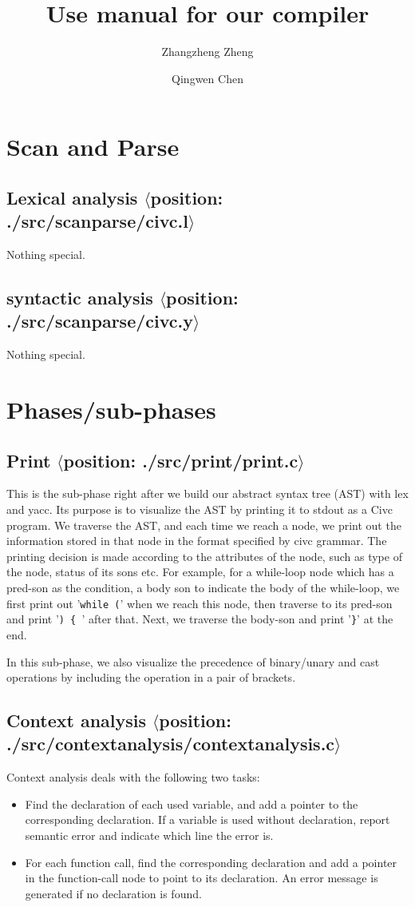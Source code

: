 \documentclass[a4paper,11pt]{article}
\title{Use manual for our compiler}
\author{Zhangzheng Zheng \and Qingwen Chen}
\begin{document}
\maketitle

\section{Scan and Parse}
\subsection{Lexical analysis $\langle$position: ./src/scanparse/civc.l$\rangle$}
Nothing special.
\subsection{syntactic analysis $\langle$position: ./src/scanparse/civc.y$\rangle$}
Nothing special.

\section{Phases/sub-phases}
\subsection{Print $\langle$position: ./src/print/print.c$\rangle$ }
This is the sub-phase right after we build our abstract syntax tree (AST) with lex and yacc. Its purpose is to visualize the AST by printing it to stdout as a Civc program. We traverse the AST, and each time we reach a node, we print out the information stored in that node in the format specified by civc grammar.  The printing decision is made according to the attributes of the node, such as type of the node, status of its sons etc. For example, for a while-loop node which has a pred-son as the condition, a body son to indicate the body of the while-loop, we first print out '\texttt{while (}' when we reach this node, then traverse to its pred-son and print '\texttt{) \{ }' after that. Next, we traverse the body-son and print '\texttt{\}}' at the end.

In this sub-phase, we also visualize the precedence of binary/unary and cast operations by including the operation in a pair of brackets.

\subsection{Context analysis $\langle$position: ./src/contextanalysis/contextanalysis.c$\rangle$}
Context analysis deals with the following two tasks:
\begin{itemize}
\item Find the declaration of each used variable, and add a pointer to the corresponding declaration. If a variable is used without declaration, report semantic error and indicate which line the error is.
 \item For each function call, find the corresponding declaration and add a pointer in the function-call node to point to its declaration. An error message    is generated if no declaration is found.
\end{itemize}
\end{document}
